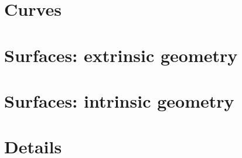 \documentclass[twoside]{book}
\begin{document}


\part{Curves}






\part{Surfaces: extrinsic geometry}


   

%
%

%
\part{Surfaces: intrinsic geometry}




\part{Details}


\appendix





\sloppy
\printbibliography[heading=bibintoc]
\fussy
\end{document}
